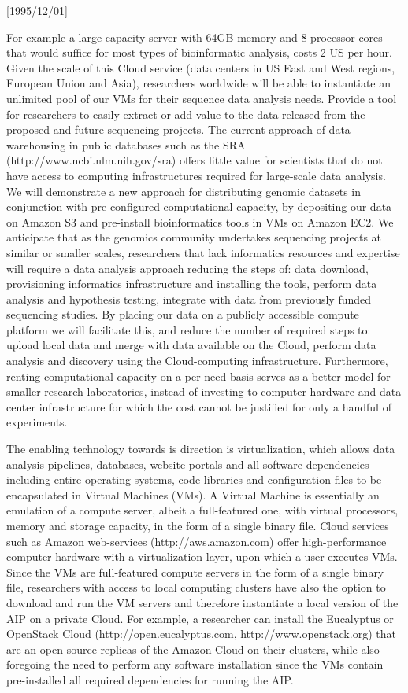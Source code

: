 \NeedsTeXFormat{LaTeX2e}[1995/12/01] \documentclass[10pt]{bmc_article}
\newenvironment{bmcformat}{\begin{raggedright}\baselineskip20pt\sloppy\setboolean{publ}{false}}{\end{raggedright}\baselineskip20pt\sloppy}
\begin{document}
\begin{bmcformat}
For example a large capacity server with 64GB memory and 8 processor cores that would suffice for most types
of bioinformatic analysis, costs 2 US per hour. Given the scale of this Cloud service (data centers in US East
and West regions, European Union and Asia), researchers worldwide will be able to instantiate an unlimited
pool of our VMs for their sequence data analysis needs. Provide a tool for researchers to easily extract or
add value to the data released from the proposed and future sequencing projects. The current approach of data
warehousing in public databases such as the SRA (http://www.ncbi.nlm.nih.gov/sra) offers little value for
scientists that do not have access to computing infrastructures required for large-scale data analysis. We
will demonstrate a new approach for distributing genomic datasets in conjunction with pre-configured
computational capacity, by depositing our data on Amazon S3 and pre-install bioinformatics tools in VMs on
Amazon EC2.  We anticipate that as the genomics community undertakes sequencing projects at similar or smaller
scales, researchers that lack informatics resources and expertise will require a data analysis approach
reducing the steps of: data download, provisioning informatics infrastructure and installing the tools,
perform data analysis and hypothesis testing, integrate with data from previously funded sequencing studies.
By placing our data on a publicly accessible compute platform we will facilitate this, and reduce the number
of required steps to: upload local data and merge with data available on the Cloud, perform data analysis and
discovery using the Cloud-computing infrastructure. Furthermore, renting computational capacity on a per need
basis serves as a better model for smaller research laboratories, instead of investing to computer hardware
and data center infrastructure for which the cost cannot be justified for only a handful of experiments.  


The enabling technology towards is direction is virtualization, which allows data analysis pipelines,
databases, website portals and all software dependencies including entire operating systems, code libraries
and configuration files to be encapsulated in Virtual Machines (VMs). A Virtual Machine is essentially an
emulation of a compute server, albeit a full-featured one, with virtual processors, memory and storage
capacity, in the form of a single binary file. Cloud services such as Amazon web-services
(http://aws.amazon.com) offer high-performance computer hardware with a virtualization layer, upon which a
user executes VMs.  Since the VMs are full-featured compute servers  in the form of a single binary file,
researchers with access to local computing clusters have also the option to download and run the VM servers
and therefore instantiate a local version of the AIP on a private Cloud. For example, a researcher can install
the Eucalyptus or OpenStack Cloud (http://open.eucalyptus.com, http://www.openstack.org) that are an
open-source replicas of the Amazon Cloud on their clusters, while also foregoing the need to perform any
software installation since the VMs contain pre-installed all required dependencies for running the AIP.


\end{bmcformat}
\end{document}
